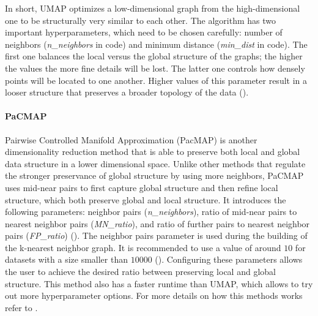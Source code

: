 In short, UMAP optimizes a low-dimensional graph from the high-dimensional one to be structurally very similar to each other. The algorithm has two important hyperparameters, which need to be chosen carefully: number of neighbors (\textit{n\_neighbors} in code) and minimum distance (\textit{min\_dist} in code). The first one balances the local versus the global structure of the graphs; the higher the values the more fine details will be lost. The latter one controls how densely points will be located to one another. Higher values of this parameter result in a looser structure that preserves a broader topology of the data (\cite{umap_web}).

\paragraph{PaCMAP}\label{section:pacmap}
Pairwise Controlled Manifold Approximation (PacMAP) is another dimensionality reduction method that is able to preserve both local and global data structure in a lower dimensional space. Unlike other methods that regulate the stronger preservance of global structure by using more neighbors, PaCMAP uses mid-near pairs to first capture global structure and then refine local structure, which both preserve global and local structure. It introduces the following parameters: neighbor pairs (\textit{n\_neighbors}), ratio of mid-near pairs to nearest neighbor pairs (\textit{MN\_ratio}), and ratio of further pairs to nearest neighbor pairs (\textit{FP\_ratio}) (\cite{Wang_2021}). The neighbor pairs parameter is used during the building of the k-nearest neighbor graph. It is recommended to use a value of around $10$ for datasets with a size smaller than $10000$ (\cite{Yingfan_git}). Configuring these parameters allows the user to achieve the desired ratio between preserving local and global structure. This method also has a faster runtime than UMAP, which allows to try out more hyperparameter options. For more details on how this methods works refer to \cite{Wang_2021}.
